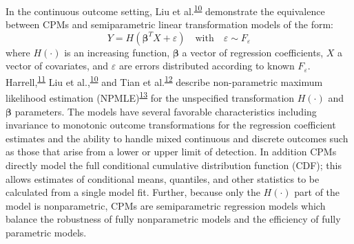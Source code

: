 \documentclass[
]{article}
\begin{document}
In the continuous outcome setting, Liu et al.\textsuperscript{\protect\hyperlink{ref-liu_modeling_2017}{10}} demonstrate the equivalence between CPMs and semiparametric linear transformation models of the form:
\begin{equation}
Y=H(\boldsymbol{\beta}^{T}X+\varepsilon) \quad \text{with} \quad \varepsilon \sim F_{\varepsilon}
\end{equation}
where \(H(\cdot)\) is an increasing function, \(\boldsymbol{\beta}\) a vector of regression coefficients, \(X\) a vector of covariates, and \(\varepsilon\) are errors distributed according to known \(F_{\varepsilon}\). Harrell,\textsuperscript{\protect\hyperlink{ref-harrell_regression_2015}{11}} Liu et al.,\textsuperscript{\protect\hyperlink{ref-liu_modeling_2017}{10}} and Tian et al.\textsuperscript{\protect\hyperlink{ref-tian_empirical_2019}{12}} describe non-parametric maximum likelihood estimation (NPMLE)\textsuperscript{\protect\hyperlink{ref-zeng_maximum_2007}{13}} for the unspecified transformation \(H(\cdot)\) and \(\boldsymbol{\beta}\) parameters. The models have several favorable characteristics including invariance to monotonic outcome transformations for the regression coefficient estimates and the ability to handle mixed continuous and discrete outcomes such as those that arise from a lower or upper limit of detection. In addition CPMs directly model the full conditional cumulative distribution function (CDF); this allows estimates of conditional means, quantiles, and other statistics to be calculated from a single model fit. Further, because only the \(H(\cdot)\) part of the model is nonparametric, CPMs are semiparametric regression models which balance the robustness of fully nonparametric models and the efficiency of fully parametric models.
\end{document}
